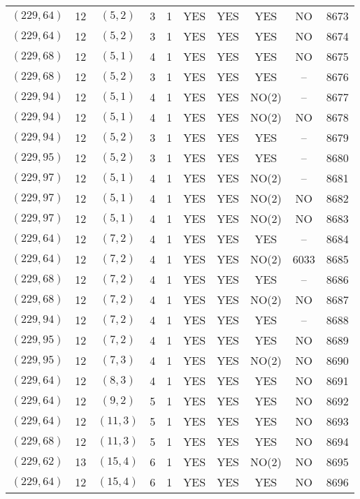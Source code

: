 \begin{longtable}{|c|c|c|c|c|c|c|c|c|c|}
$(229, 64)$ & 12 & $(5, 2)$ & 3 & 1 & YES & YES & YES & NO & 8673\\
$(229, 64)$ & 12 & $(5, 2)$ & 3 & 1 & YES & YES & YES & NO & 8674\\
$(229, 68)$ & 12 & $(5, 1)$ & 4 & 1 & YES & YES & YES & NO & 8675\\
$(229, 68)$ & 12 & $(5, 2)$ & 3 & 1 & YES & YES & YES & -- & 8676\\
$(229, 94)$ & 12 & $(5, 1)$ & 4 & 1 & YES & YES & NO(2) & -- & 8677\\
$(229, 94)$ & 12 & $(5, 1)$ & 4 & 1 & YES & YES & NO(2) & NO & 8678\\
$(229, 94)$ & 12 & $(5, 2)$ & 3 & 1 & YES & YES & YES & -- & 8679\\
$(229, 95)$ & 12 & $(5, 2)$ & 3 & 1 & YES & YES & YES & -- & 8680\\
$(229, 97)$ & 12 & $(5, 1)$ & 4 & 1 & YES & YES & NO(2) & -- & 8681\\
$(229, 97)$ & 12 & $(5, 1)$ & 4 & 1 & YES & YES & NO(2) & NO & 8682\\
$(229, 97)$ & 12 & $(5, 1)$ & 4 & 1 & YES & YES & NO(2) & NO & 8683\\
$(229, 64)$ & 12 & $(7, 2)$ & 4 & 1 & YES & YES & YES & -- & 8684\\
$(229, 64)$ & 12 & $(7, 2)$ & 4 & 1 & YES & YES & NO(2) & 6033 & 8685\\
$(229, 68)$ & 12 & $(7, 2)$ & 4 & 1 & YES & YES & YES & -- & 8686\\
$(229, 68)$ & 12 & $(7, 2)$ & 4 & 1 & YES & YES & NO(2) & NO & 8687\\
$(229, 94)$ & 12 & $(7, 2)$ & 4 & 1 & YES & YES & YES & -- & 8688\\
$(229, 95)$ & 12 & $(7, 2)$ & 4 & 1 & YES & YES & YES & NO & 8689\\
$(229, 95)$ & 12 & $(7, 3)$ & 4 & 1 & YES & YES & NO(2) & NO & 8690\\
$(229, 64)$ & 12 & $(8, 3)$ & 4 & 1 & YES & YES & YES & NO & 8691\\
$(229, 64)$ & 12 & $(9, 2)$ & 5 & 1 & YES & YES & YES & NO & 8692\\
$(229, 64)$ & 12 & $(11, 3)$ & 5 & 1 & YES & YES & YES & NO & 8693\\
$(229, 68)$ & 12 & $(11, 3)$ & 5 & 1 & YES & YES & YES & NO & 8694\\
$(229, 62)$ & 13 & $(15, 4)$ & 6 & 1 & YES & YES & NO(2) & NO & 8695\\
$(229, 64)$ & 12 & $(15, 4)$ & 6 & 1 & YES & YES & YES & NO & 8696\\

\end{longtable}
